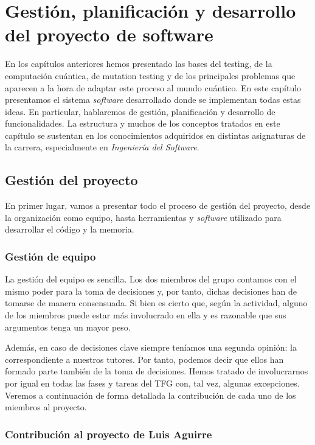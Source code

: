 \chapter[Gestión, planificación y desarrollo del software]{Gestión, planificación y desarrollo del proyecto de software}

En los capítulos anteriores  hemos presentado las bases del testing, de la computación cuántica, de mutation testing y de los principales problemas que aparecen a la hora de adaptar este proceso al mundo cuántico. 
%
En este capítulo presentamos el sistema
\textit{software} desarrollado donde se implementan todas estas ideas. En particular,
hablaremos de gestión, planificación y desarrollo de funcionalidades. La estructura y muchos de los conceptos tratados en este capítulo se sustentan en los conocimientos adquiridos en  distintas asignaturas de la carrera, especialmente en \textit{Ingeniería del Software}. 

\section{Gestión del proyecto}

En primer lugar, vamos a presentar todo el proceso de gestión del proyecto, desde la organización como equipo, hasta herramientas y \textit{software} utilizado para  desarrollar el código y la memoria.

\subsection{Gestión de equipo}

La gestión del equipo es sencilla. Los dos miembros del grupo contamos con el mismo poder para la toma de decisiones y, por tanto, dichas decisiones han de tomarse de manera consensuada. Si bien es cierto que, según la actividad, alguno de los miembros puede estar más involucrado en ella y es razonable que sus argumentos tenga un mayor peso.

Además, en caso de decisiones clave siempre teníamos una segunda opinión: la correspondiente a nuestros tutores.  Por tanto, podemos decir que ellos han formado parte también de la toma de decisiones. Hemos tratado de involucrarnos por igual en todas las fases y tareas del TFG con, tal vez, algunas excepciones. Veremos a continuación de forma detallada la contribución de cada uno de los miembros al proyecto.

\subsection{Contribución al proyecto de Luis Aguirre}

